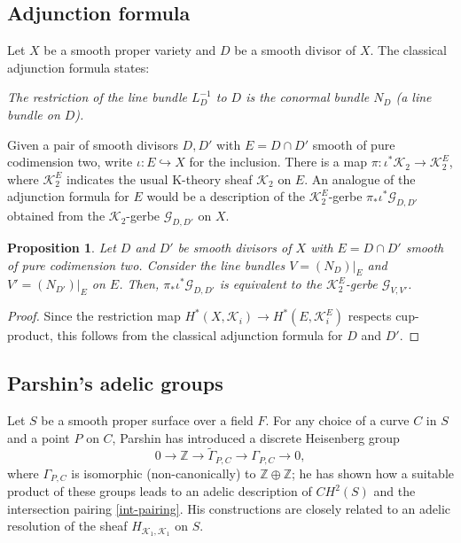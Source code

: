 \documentclass{amsart}
\numberwithin{equation}{subsection}
\newtheorem{proposition}[theorem]{Proposition}
\theoremstyle{remark}
\theoremstyle{remark}
\newcommand{\cG}{\mathcal{G}}
\newcommand{\cK}{\mathcal{K}}
\newcommand{\bbZ}{\mathbb{Z}}
\begin{document}
\subsection{Adjunction formula} Let $X$ be a smooth proper variety and $D$ be a smooth divisor of $X$.  The classical adjunction formula states: 

 \textit{The restriction of the line bundle $L_D^{-1}$ to $D$ is the conormal bundle $N_D$ (a line bundle on $D$).} 
 
 Given a pair of smooth divisors $D, D'$ with $E = D \cap D'$ smooth of pure codimension two, write $\iota: E \hookrightarrow X$ for the inclusion. There is a map $\pi: \iota^*\cK_2 \to \cK_2^E$, where $\cK_2^E$ indicates the usual K-theory sheaf $\cK_2$ on $E$. 
 An analogue of the adjunction formula for $E$ would be a description of the $\cK_2^E$-gerbe $\pi_*  \iota^*\cG_{D,D'}$ obtained from the $\cK_2$-gerbe $\cG_{D, D'}$ on $X$.   
 \begin{proposition}
   Let $D$ and $D'$ be smooth divisors of $X$ with $E = D \cap D'$ smooth of pure codimension two. 
   Consider the line bundles $V = (N_D)|_E$ and $V'= (N_{D'})|_E$ on $E$. Then, $\pi_*  \iota^*\cG_{D, D'}$ is equivalent to the $\cK^E_2$-gerbe $\cG_{V, V'}$.
\end{proposition}
\begin{proof} 
  Since the restriction map $H^*(X, \cK_i) \to H^*(E, \cK^E_i)$ respects cup-product, this follows from the classical adjunction formula for $D$ and $D'$. 
\end{proof}

\subsection{Parshin's adelic groups} Let $S$ be a smooth proper surface over a field $F$. 
For any choice of a curve $C$ in $S$ and a point $P$ on $C$, Parshin
\cite[(18)]{Parshin} has introduced a discrete Heisenberg group
\begin{equation*}
  0 \to \bbZ \to \tilde{\Gamma}_{P,C} \to \Gamma_{P,C} \to 0,
\end{equation*}
where $\Gamma_{P,C}$ is isomorphic (non-canonically) to $\bbZ \oplus \bbZ$;  he has shown \cite[end of
\S 3]{Parshin} how a suitable product of these groups leads to an adelic
description of $CH^2(S)$ and the intersection pairing \eqref{int-pairing}.  His
constructions are closely related to an adelic resolution of the sheaf
$H_{\cK_1, \cK_1}$ on $S$. 
\end{document}
